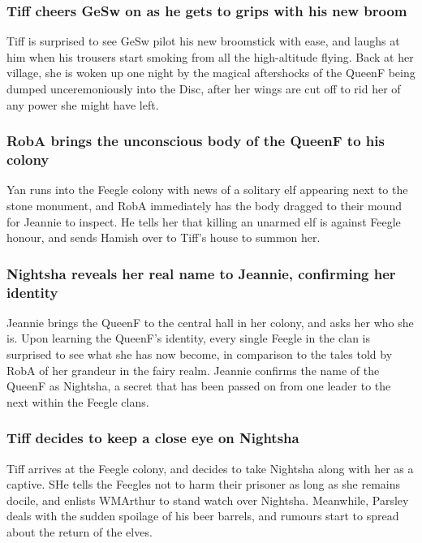 \subsubsection{\Gls{Tiff} cheers \Gls{GeSw} on as he gets to grips with his new broom}
\Gls{Tiff} is surprised to see \Gls{GeSw} pilot his new broomstick with ease, and laughs at him
when his trousers start smoking from all the high-altitude flying. Back at her village, she is woken
up one night by the magical aftershocks of the \Gls{QueenF} being dumped unceremoniously into the
Disc, after her wings are cut off to rid her of any power she might have left.

\subsubsection{\Gls{RobA} brings the unconscious body of the \Gls{QueenF} to his colony}
\Gls{Yan} runs into the Feegle colony with news of a solitary elf appearing next to the stone
monument, and \Gls{RobA} immediately has the body dragged to their mound for \Gls{Jeannie} to
inspect. He tells her that killing an unarmed elf is against Feegle honour, and sends \Gls{Hamish}
over to \Gls{Tiff}'s house to summon her.

\subsubsection{\Gls{Nightsha} reveals her real name to \Gls{Jeannie}, confirming her identity}
\Gls{Jeannie} brings the \Gls{QueenF} to the central hall in her colony, and asks her who she is.
Upon learning the \Gls{QueenF}'s identity, every single Feegle in the clan is surprised to see what
she has now become, in comparison to the tales told by \Gls{RobA} of her grandeur in the fairy
realm. \Gls{Jeannie} confirms the name of the \Gls{QueenF} as \Gls{Nightsha}, a secret that has
been passed on from one leader to the next within the Feegle clans.

\subsubsection{\Gls{Tiff} decides to keep a close eye on \Gls{Nightsha}}
\Gls{Tiff} arrives at the Feegle colony, and decides to take \Gls{Nightsha} along with her as a
captive. SHe tells the Feegles not to harm their prisoner as long as she remains docile, and
enlists \Gls{WMArthur} to stand watch over \Gls{Nightsha}. Meanwhile, \Gls{Parsley} deals with the
sudden spoilage of his beer barrels, and rumours start to spread about the return of the elves.

